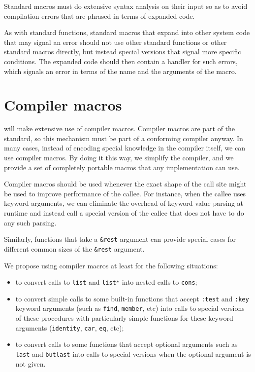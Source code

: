 Standard macros must do extensive syntax analysis on their input so as
to avoid compilation errors that are phrased in terms of expanded
code.  

As with standard functions, standard macros that expand into other
system code that may signal an error should not use other standard
functions or other standard macros directly, but instead special
versions that signal more specific conditions.  The expanded code
should then contain a handler for such errors, which signals an error
in terms of the name and the arguments of the macro. 

\section{Compiler macros}

{\sysname} will make extensive use of compiler macros.  Compiler
macros are part of the standard, so this mechanism must be part of a
conforming compiler anyway.  In many cases, instead of encoding
special knowledge in the compiler itself, we can use compiler macros.
By doing it this way, we simplify the compiler, and we provide a set
of completely portable macros that any implementation can use. 

Compiler macros should be used whenever the exact shape of the call
site might be used to improve performance of the callee.  For
instance, when the callee uses keyword arguments, we can eliminate the
overhead of keyword-value parsing at runtime and instead call a
special version of the callee that does not have to do any such
parsing.%

Similarly, functions that take a \texttt{\&rest} argument can provide
special cases for different common sizes of the \texttt{\&rest}
argument.

We propose using compiler macros at least for the following
situations: 

\begin{itemize}
\item to convert calls to \texttt{list} and \texttt{list*} into nested
  calls to \texttt{cons};
\item to convert simple calls to some built-in functions that accept
  \texttt{:test} and \texttt{:key} keyword arguments (such as
  \texttt{find}, \texttt{member}, etc) into calls to
  special versions of these procedures with particularly simple
  functions for these keyword arguments (\texttt{identity},
  \texttt{car}, \texttt{eq}, etc);
\item to convert calls to some functions that accept optional
  arguments such as \texttt{last} and \texttt{butlast} into calls to
  special versions when the optional argument is not given.
\end{itemize}

